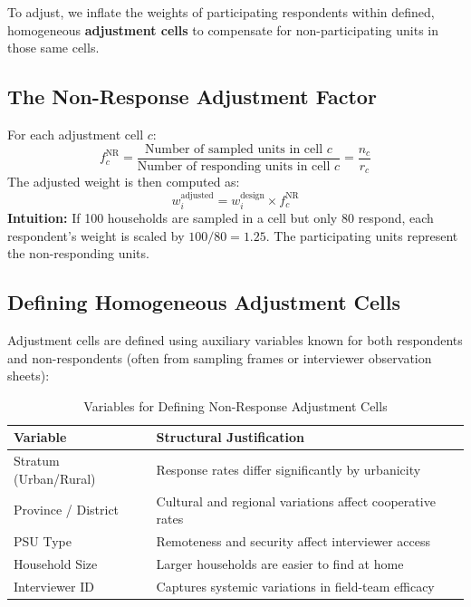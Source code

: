 \documentclass[11pt,a4paper]{article}
\begin{document}
To adjust, we inflate the weights of participating respondents within defined, homogeneous \textbf{adjustment cells} to compensate for non-participating units in those same cells.

\subsection{The Non-Response Adjustment Factor}
For each adjustment cell $c$:
\begin{equation}
  f_c^{\text{NR}} = \frac{\text{Number of sampled units in cell } c}{\text{Number of responding units in cell } c} = \frac{n_c}{r_c}
\end{equation}
The adjusted weight is then computed as:
\begin{equation}
  w_i^{\text{adjusted}} = w_i^{\text{design}} \times f_c^{\text{NR}}
\end{equation}
\textbf{Intuition:} If 100 households are sampled in a cell but only 80 respond, each respondent's weight is scaled by $100/80 = 1.25$. The participating units represent the non-responding units.

\subsection{Defining Homogeneous Adjustment Cells}
Adjustment cells are defined using auxiliary variables known for both respondents and non-respondents (often from sampling frames or interviewer observation sheets):

\begin{table}[htbp]
  \centering
  \caption{Variables for Defining Non-Response Adjustment Cells}
  \label{tab:nr_cells}
  \begin{tabularx}{\textwidth}{lX}
    \toprule
    \textbf{Variable} & \textbf{Structural Justification} \\
    \midrule
    Stratum (Urban/Rural) & Response rates differ significantly by urbanicity \\
    Province / District & Cultural and regional variations affect cooperative rates \\
    PSU Type & Remoteness and security affect interviewer access \\
    Household Size & Larger households are easier to find at home \\
    Interviewer ID & Captures systemic variations in field-team efficacy \\
    \bottomrule
  \end{tabularx}
\end{table}
\end{document}
